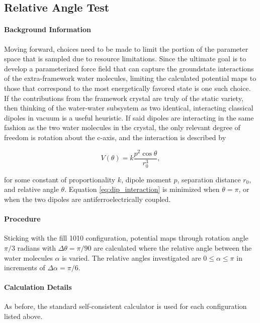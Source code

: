         \subsection{Relative Angle Test}
        \label{sec:rel_ang_Test}
        
        \paragraph{Background Information }Moving forward, choices need to be made to limit the portion of the parameter space that is sampled due to resource limitations. Since the ultimate goal is to develop a parameterized force field that can capture the groundstate interactions of the extra-framework water molecules, limiting the calculated potential maps to those that correspond to the most energetically favored state is one such choice. If the contributions from the framework crystal are truly of the static variety, then thinking of the water-water subsystem as two identical, interacting classical dipoles in vacuum is a useful heuristic. If said dipoles are interacting in the same fashion as the two water molecules in the crystal, the only relevant degree of freedom is rotation about the c-axis, and the interaction is described by
        
        \begin{equation}
        \label{eq:dip_interaction}
            V(\theta) = k\frac{p^2\cos \theta}{r_0^3},
        \end{equation}
        
        \noindent for some constant of proportionality $k$, dipole moment $p$, separation distance $r_0$, and relative angle $\theta$. Equation \ref{eq:dip_interaction} is minimized when $\theta = \pi$, or when the two dipoles are antiferroelectrically coupled. 
        
        \paragraph{Procedure} Sticking with the fill 1010 configuration, potential maps through rotation angle $\pi/3$ radians with $\Delta \theta = \pi/90$ are calculated where the relative angle between the water molecules $\alpha$ is varied. The relative angles investigated are $0 \le \alpha \le \pi$ in increments of $\Delta \alpha = \pi/6$.
        
        \paragraph{Calculation Details} As before, the standard self-consistent calculator is used for each configuration listed above.
        
